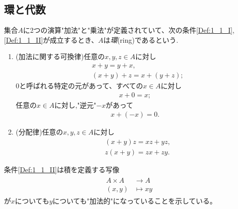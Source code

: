 \documentclass[../main]{subfiles}
\begin{document}

\subsection{環と代数}

\begin{definition}[環]\label{Def:1_1}
  集合$A$に2つの演算"加法"と"乗法"が定義されていて、次の条件\ref{Def:1_1_I},\ref{Def:1_1_II}が成立するとき、$A$は\emph{環}(ring)であるという.
  \begin{enumerate}[label=(\Roman*)]
    \item \label{Def:1_1_I}
      (加法に関する可換律)任意の$x,y,z\in A$に対し
      \begin{align}
        & x+y = y+x,\\
        & (x+y)+z = x+(y+z);
      \end{align}
      $0$と呼ばれる特定の元があって、すべての$x\in A$に対し
      \begin{align}
        x+0=x;
      \end{align}
      任意の$x\in A$に対し,"逆元"$-x$があって
      \begin{align}
        x+(-x)=0.
      \end{align}
    \item \label{Def:1_1_II}
      (分配律)任意の$x,y,z\in A$に対し
      \begin{align}
        & (x+y)z = xz+yz,\\
        & z(x+y) = zx+zy.
      \end{align}
  \end{enumerate}
\end{definition}

\begin{remark}
  条件\ref{Def:1_1_II}は積を定義する写像
  \begin{align*}
    \begin{split}
      A\times A&\longrightarrow A\\
      (x,y)&\mapsto xy
    \end{split}
    \tag{1}
    \label{eq:1_(1)}
  \end{align*}
  が$x$についても$y$についても"加法的"になっていることを示している。
\end{remark}
\end{document}
